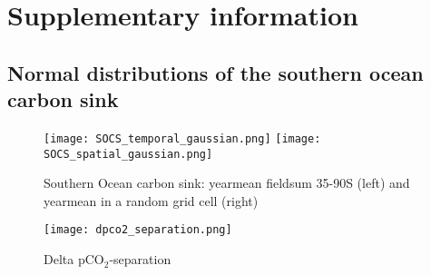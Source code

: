 \documentclass[12pt]{article}
\begin{document}
\newpage
\baselineskip18pt
%



\newpage

\section*{Supplementary information}

\subsection*{Normal distributions of the southern ocean carbon sink}
\begin{figure}[h]
\texttt{[image: SOCS\_temporal\_gaussian.png]} %
\texttt{[image: SOCS\_spatial\_gaussian.png]} %
\caption{Southern Ocean carbon sink: yearmean fieldsum 35-90S (left) and yearmean in a random grid cell (right)}
\label{fig:SOCS_temporal_gaussian}
\end{figure}


\begin{figure}[h]
\texttt{[image: dpco2\_separation.png]} %
\caption{Delta pCO$_2$-separation \citep{Takahashi2002}}
\label{fig:dpco2_separation}
\end{figure}
\end{document}
